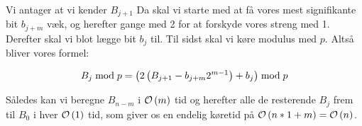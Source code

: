 Vi antager at vi kender $B_{j+1}$ Da skal vi starte med at få vores mest signifikante bit $b_{j+m}$ væk, og herefter gange med 2 for at forskyde vores streng med 1. Derefter skal vi blot lægge bit $b_j$ til. Til sidst skal vi køre modulus med $p$. Altså bliver vores formel:

$$
  B_{j} \bmod p
  = \left( 2 \left(  B_{j+1} - b_{j+m} 2^{m-1}  \right) + b_j \right) \bmod p
$$

Således kan vi beregne $B_{n-m}$ i $\mathcal{O} \left(  m  \right)$ tid og herefter alle de resterende $B_j$ frem til $B_0$ i hver $\mathcal{O} \left(  1  \right)$ tid, som giver os en endelig køretid på $\mathcal{O} \left(  n*1 + m  \right) = \mathcal{O} \left(  n  \right)$.




